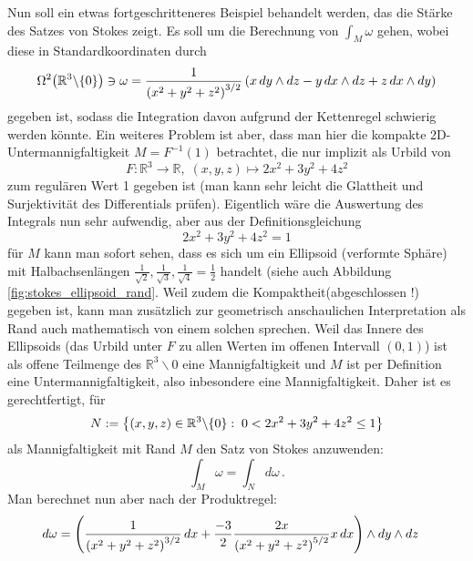 \documentclass[../H_Analysis_main.tex]{subfiles}
\begin{document}
\begin{bsp}
Nun soll ein etwas fortgeschritteneres Beispiel behandelt werden, das die Stärke des Satzes von Stokes zeigt. Es soll um die Berechnung von $\int_M \omega$ gehen, wobei diese in Standardkoordinaten durch
\begin{equation}
\Omega^2\qty(\mathbb{R}^3 \backslash \qty{0}) \ni \omega = \frac{1}{\qty(x^2 + y^2 + z^2)^{3/2}} \, \qty(x \, dy \wedge dz - y \, dx \wedge dz + z \, dx \wedge dy)
\end{equation}
gegeben ist, sodass die Integration davon aufgrund der Kettenregel schwierig werden könnte. Ein weiteres Problem ist aber, dass man hier die kompakte 2D-Untermannigfaltigkeit $M = F^{-1}(1)$ betrachtet, die nur implizit als Urbild von
\begin{equation}
F: \mathbb{R}^3 \rightarrow \mathbb{R}, \; (x, y, z) \mapsto 2x^2 + 3y^2 + 4z^2
\end{equation}
zum regulären Wert 1 gegeben ist (man kann sehr leicht die Glattheit und Surjektivität des Differentials prüfen). Eigentlich wäre die Auswertung des Integrals nun sehr aufwendig, aber aus der Definitionsgleichung
\begin{equation*}
2x^2 + 3y^2 + 4z^2 = 1
\end{equation*}
für $M$ kann man sofort sehen, dass es sich um ein Ellipsoid (verformte Sphäre) mit Halbachsenlängen $\frac{1}{\sqrt{2}}, \frac{1}{\sqrt{3}}, \frac{1}{\sqrt{4}} = \frac{1}{2}$ handelt (siehe auch Abbildung \ref{fig:stokes_ellipsoid_rand}. Weil zudem die Kompaktheit(abgeschlossen !) gegeben ist, kann man zusätzlich zur geometrisch anschaulichen Interpretation als Rand auch mathematisch von einem solchen sprechen. Weil das Innere des Ellipsoids (das Urbild unter $F$ zu allen Werten im offenen Intervall $(0, 1)$) ist als offene Teilmenge des $\mathbb{R}^3 \backslash \qty{0}$ eine Mannigfaltigkeit und $M$ ist per Definition eine Untermannigfaltigkeit, also inbesondere eine Mannigfaltigkeit. Daher ist es gerechtfertigt, für
\begin{equation*}
N := \qty{(x, y, z) \in \mathbb{R}^3 \backslash \qty{0}: \; 0 < 2x^2 + 3y^2 + 4z^2 \leq 1}
\end{equation*}
als Mannigfaltigkeit mit Rand $M$ den Satz von Stokes anzuwenden:
\begin{equation*}
\int_M \omega = \int_N d\omega \, .
\end{equation*}
Man berechnet nun aber nach der Produktregel:
\begin{align*}
d\omega &= \qty(\frac{1}{\qty(x^2 + y^2 + z^2)^{3/2}} \, dx + \frac{-3}{2} \frac{2 x}{\qty(x^2 + y^2 + z^2)^{5/2}} x \, dx) \wedge dy \wedge dz

\end{align*}
\end{bsp}
\end{document}
